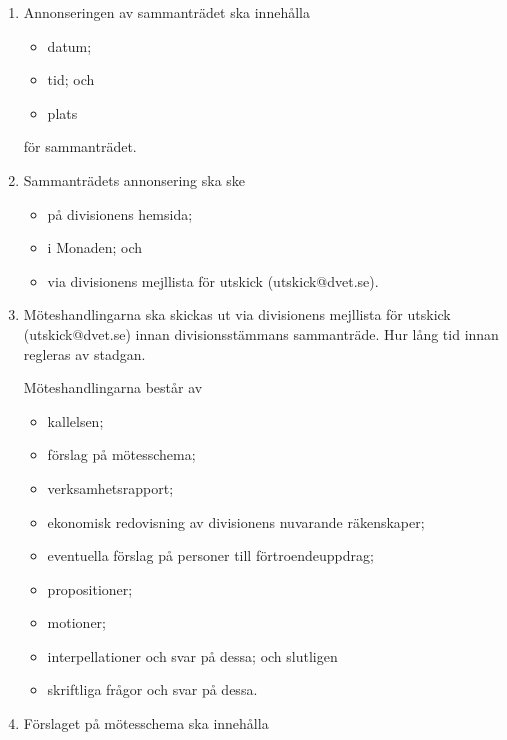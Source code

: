 \documentclass{dvd}
\begin{document}
	\begin{enumerate}[label=\arabic* §, ref=\arabic*]
		\item Annonseringen av sammanträdet ska innehålla

		\begin{itemize}
			\item datum;
			\item tid; och
			\item plats
		\end{itemize}

		för sammanträdet.

		\item Sammanträdets annonsering ska ske

		\begin{itemize}
			\item på divisionens hemsida;
			\item i Monaden; och
			\item via divisionens mejllista för utskick (utskick@dvet.se).
		\end{itemize}

		\item Möteshandlingarna ska skickas ut via divisionens mejllista för utskick (utskick@dvet.se) innan divisionsstämmans sammanträde.
		Hur lång tid innan regleras av stadgan.

		Möteshandlingarna består av

		\begin{itemize}
			\item kallelsen;
			\item förslag på mötesschema;
			\item verksamhetsrapport;
			\item ekonomisk redovisning av divisionens nuvarande räkenskaper;
			\item eventuella förslag på personer till förtroendeuppdrag;
			\item propositioner;
			\item motioner;
			\item interpellationer och svar på dessa; och slutligen
			\item skriftliga frågor och svar på dessa.
		\end{itemize}

		\item Förslaget på mötesschema ska innehålla


\end{enumerate}
\end{document}
